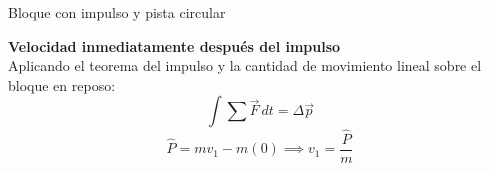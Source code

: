 \begin{solucion}{Bloque con impulso y pista circular}

\textbf{Velocidad inmediatamente después del impulso}\\
Aplicando el teorema del impulso y la cantidad de movimiento lineal sobre el bloque en reposo:
$$\int \sum \vec{F}\, dt = \Delta \vec{p}$$
$$\hat{P} = m v_1 - m(0) \implies v_1 = \frac{\hat{P}}{m}$$


\end{solucion}
